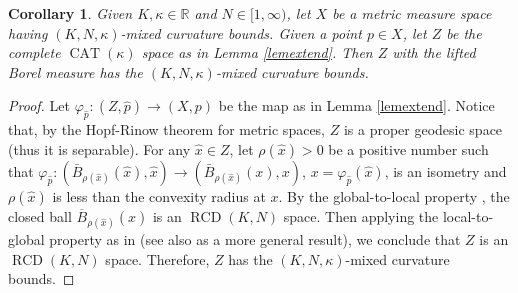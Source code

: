 \documentclass[11pt,reqno]{amsart}
\newtheorem{corollary}[theorem]{Corollary}
\theoremstyle{definition}
\numberwithin{equation}{section}
\newcommand{\dR}{\mathbb{R}}
\DeclareMathOperator{\CAT}{CAT}
\DeclareMathOperator{\RCD}{RCD}
\begin{document}
\begin{corollary}\label{cormix} Given $K, \kappa\in \dR$ and $N \in [1, \infty)$,
let $X$ be a metric measure space having $(K, N, \kappa)$-mixed curvature bounds.  Given a point $p \in X$, let $Z$ be the complete $\CAT(\kappa)$ space as in Lemma \ref{lemextend}. 
Then $Z$ with the lifted Borel measure has the $(K, N, \kappa)$-mixed curvature bounds.    
\end{corollary}

\begin{proof}
Let $\varphi_{\hat{p}}: (Z, \hat{p}) \to (X, p)$ be the map 
	as in Lemma \ref{lemextend}. Notice that, by the Hopf-Rinow theorem for metric spaces, $Z$ is a proper geodesic space (thus it is separable).
	For any $\hat{x} \in  Z$,
	let $\rho(\hat{x}) > 0$ be a positive number such that $\varphi_{\hat{p}}: (\bar B_{\rho(\hat{x})} (\hat{x}), \hat{x}) \to (\bar B_{\rho(\hat{x})} (x), x)$, $x = \varphi_{\hat{p}}(\hat{x})$,  
	is an isometry and $\rho (\hat{x})$ is less than the convexity radius at $x$. 
	By the global-to-local property \cite[Proposition 7.7]{AMSbe}, the closed ball $\overline{B}_{\rho(\hat{x})}(\hat{x})$
	is an $\RCD(K,N)$ space.  Then applying the local-to-global property as in \cite[Theorem 7.8]{AMSbe} (see also \cite[Theorem 18]{Serg} as a more general result), we conclude that $Z$ is
 an $\RCD(K, N)$ space. Therefore, $Z$ has the $(K, N, \kappa)$-mixed curvature bounds.
\end{proof}
\end{document}
